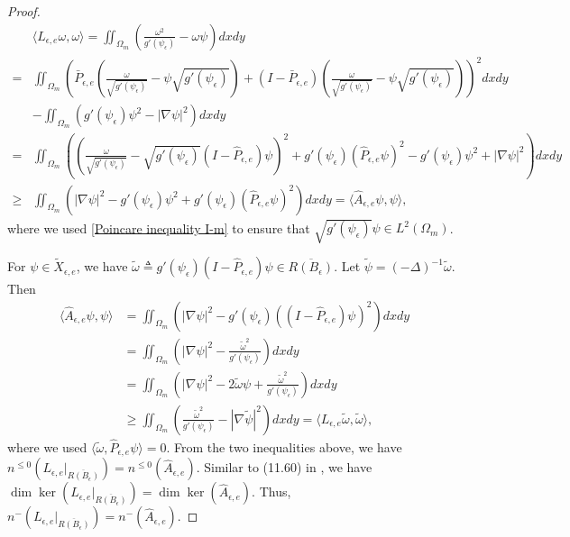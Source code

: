 \documentclass[1 [leqno, 11pt]{amsart}
\numberwithin{equation}{section}
\let\ep=\epsilon
\begin{document}
\begin{CJK*}{GBK}{song}
\begin{proof}
\begin{align*}
&\langle L_{\ep,e} \omega, \omega \rangle
= \iint_{\Omega_m} \left(\frac{\omega^2}{g'(\psi_\ep)} - \omega \psi\right) dxdy \\
= &\iint_{\Omega_m}\left(\bar{P}_{\ep,e}\left( \frac{\omega}{\sqrt{g'(\psi_\ep)}} - \psi \sqrt{g'(\psi_\ep)}\right)+(I-\bar{P}_{\ep,e})\left( \frac{\omega}{\sqrt{g'(\psi_\ep)}} - \psi \sqrt{g'(\psi_\ep)}\right) \right)^2 dxdy \\
&- \iint_{\Omega_m}\left(g'(\psi_\ep)\psi^2 -|\nabla \psi|^2\right) dxdy \\
=& \iint_{\Omega_m} \left(\left( \frac{\omega}{\sqrt{g'(\psi_\ep)}} - \sqrt{g'(\psi_\ep)} (I - \hat{P}_{\ep,e}) \psi \right)^2 + g'(\psi_\ep) (\hat{P}_{\ep,e} \psi)^2  - g'(\psi_\ep)\psi^2 + |\nabla \psi|^2 \right)dxdy \\
 \geq& \iint_{\Omega_m} \left(|\nabla \psi|^2 - g'(\psi_\ep)\psi^2 + g'(\psi_\ep) (\hat{P}_{\ep,e}\psi)^2 \right)dxdy = \langle\hat{A}_{\ep,e} \psi, \psi\rangle,
\end{align*}
where we used \eqref{Poincare inequality I-m} to ensure that $\sqrt{g'(\psi_\ep)}\psi\in L^2(\Omega_m)$.

For $\psi\in\tilde{X}_{\ep, e}$, we have $\tilde{\omega} \triangleq g'(\psi_\ep)(I - \hat{P}_{\ep,e})\psi \in \overline{R(B_\ep)}$. Let $\tilde{\psi} = (-\Delta)^{-1}\tilde{\omega}$. Then
\begin{align}\nonumber
\langle\hat{A}_{\ep,e} \psi, \psi\rangle
&= \iint_{\Omega_m} \left( |\nabla \psi|^2 - g'(\psi_\ep)((I - \hat{P}_{\ep,e})\psi)^2\right) dxdy \\\nonumber
&= \iint_{\Omega_m} \left( |\nabla \psi|^2 - \frac{\tilde{\omega}^2}{g'(\psi_\ep)}\right)dxdy \\\nonumber
&= \iint_{\Omega_m} \left(|\nabla \psi|^2 - 2 \tilde{\omega} \psi + \frac{\tilde{\omega}^2}{g'(\psi_\ep)}\right)dxdy \\\nonumber
& \geq \iint_{\Omega_m}  \left(\frac{\tilde{\omega}^2}{g'(\psi_\ep)} - |\nabla \tilde{\psi}|^2\right) dxdy = \langle L_{\ep,e}\tilde{\omega}, \tilde{\omega} \rangle,
\end{align}
where we used $\langle\tilde \omega, \hat{P}_{\ep,e}\psi\rangle=0$.
From the two inequalities above, we have $n^{\leq0}\left( L_{\ep,e} |_{\overline{R(B_\ep)}} \right) = n^{\leq0}\left(\hat{A}_{\ep,e}\right)$.
Similar to (11.60) in \cite{lin2022instability}, we have $\dim \ker \left(L_{\ep,e} |_{\overline{R(B_\ep)}} \right)=\dim \ker (\hat{A}_{\ep,e})$. Thus,
 $n^{-}\left( L_{\ep,e} |_{\overline{R(B_\ep)}} \right) = n^{-}\left(\hat{A}_{\ep,e}\right)$.
\end{proof}


\end{CJK*}
\end{document}
